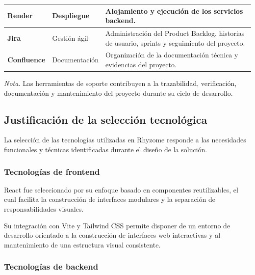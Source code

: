 \begin{table}[htbp]
\begin{tabularx}{\textwidth}{
			|>{\raggedright\arraybackslash}p{2.8cm}|
			>{\raggedright\arraybackslash}p{2.8cm}|
			>{\raggedright\arraybackslash}X|
		}
		\hline
		
		\textbf{Render} &
		Despliegue &
		Alojamiento y ejecución de los servicios backend. \\
		
		\hline
		
		\textbf{Jira} &
		Gestión ágil &
		Administración del Product Backlog, historias de usuario, sprints y seguimiento del proyecto. \\
		
		\hline
		
		\textbf{Confluence} &
		Documentación &
		Organización de la documentación técnica y evidencias del proyecto. \\
		
		\hline
		
	\end{tabularx}
	
	\par\smallskip
	\raggedright
	
	\textit{Nota.} Las herramientas de soporte contribuyen a la trazabilidad, verificación, documentación y mantenimiento del proyecto durante su ciclo de desarrollo.
	
\end{table}

\FloatBarrier

\subsection{Justificación de la selección tecnológica}

La selección de las tecnologías utilizadas en Rhyzome responde a las necesidades funcionales y técnicas identificadas durante el diseño de la solución.

\subsubsection{Tecnologías de frontend}

React fue seleccionado por su enfoque basado en componentes reutilizables, el cual facilita la construcción de interfaces modulares y la separación de responsabilidades visuales.

Su integración con Vite y Tailwind CSS permite disponer de un entorno de desarrollo orientado a la construcción de interfaces web interactivas y al mantenimiento de una estructura visual consistente.

\subsubsection{Tecnologías de backend}

